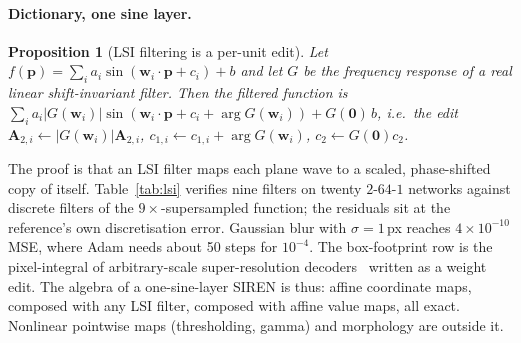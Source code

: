 \documentclass[11pt]{article}
\newtheorem{proposition}{Proposition}
\begin{document}
\paragraph{Dictionary, one sine layer.}
\begin{proposition}[LSI filtering is a per-unit edit]
\label{prop:lsi}
Let $f(\mathbf p)=\sum_i a_i\sin(\mathbf w_i\!\cdot\!\mathbf p+c_i)+b$ and let $G$ be the frequency response of a real linear shift-invariant filter. Then the filtered function is $\sum_i a_i|G(\mathbf w_i)|\sin(\mathbf w_i\!\cdot\!\mathbf p+c_i+\arg G(\mathbf w_i))+G(\mathbf 0)\,b$, i.e.\ the edit $\mathbf A_{2,i}\leftarrow|G(\mathbf w_i)|\mathbf A_{2,i}$, $c_{1,i}\leftarrow c_{1,i}+\arg G(\mathbf w_i)$, $c_2\leftarrow G(\mathbf 0)c_2$.
\end{proposition}
The proof is that an LSI filter maps each plane wave to a scaled, phase-shifted copy of itself. Table~\ref{tab:lsi} verifies nine filters on twenty $2$-$64$-$1$ networks against discrete filters of the $9\times$-supersampled function; the residuals sit at the reference's own discretisation error. Gaussian blur with $\sigma=1$\,px reaches $4\times10^{-10}$ MSE, where Adam needs about 50 steps for $10^{-4}$. The box-footprint row is the pixel-integral of arbitrary-scale super-resolution decoders~\citep{chen2021liif,lee2022lte} written as a weight edit. The algebra of a one-sine-layer SIREN is thus: affine coordinate maps, composed with any LSI filter, composed with affine value maps, all exact. Nonlinear pointwise maps (thresholding, gamma) and morphology are outside it.
\end{document}
